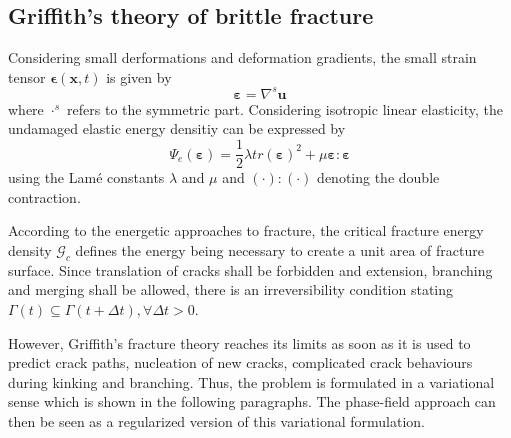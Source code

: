 \subsection{Griffith's theory of brittle fracture} \label{sec:formul_Griffith}
Considering small derformations and deformation gradients, the small strain tensor $\mathbf{\epsilon}\left(\mathbf{x},t\right)$ is given by
\begin{equation}
	\bm{\varepsilon} = \nabla^{s}\mathbf{u}
\end{equation}
where $\cdot^{s}$ refers to the symmetric part. Considering isotropic linear elasticity, the undamaged elastic energy densitiy can be expressed by
\begin{equation} \label{eq:psi_e}
	\Psi_ {e}\left(\bm{\varepsilon}\right) = \dfrac{1}{2}\lambda tr\left(\bm{\varepsilon}\right)^{2}+\mu\bm{\varepsilon}:\bm{\varepsilon}
\end{equation}
using the Lam\'{e} constants $\lambda$ and $\mu$ and $\left(\cdot\right):\left(\cdot\right)$ denoting the double contraction.

According to the energetic approaches to fracture, the critical fracture energy density $\mathcal{G}_{c}$ defines the energy being necessary to create a unit area of fracture surface. Since translation of cracks shall be forbidden and extension, branching and merging shall be allowed, there is an irreversibility condition stating $\Gamma\left(t\right)\subseteq\Gamma\left(t+\Delta t\right), \forall \Delta t>0$.

However, Griffith's fracture theory reaches its limits as soon as it is used to predict crack paths, nucleation of new cracks, complicated crack behaviours during kinking and branching. Thus, the problem is formulated in a variational sense which is shown in the following paragraphs. The phase-field approach can then be seen as a regularized version of this variational formulation. \citep{05_PF_ductile}

